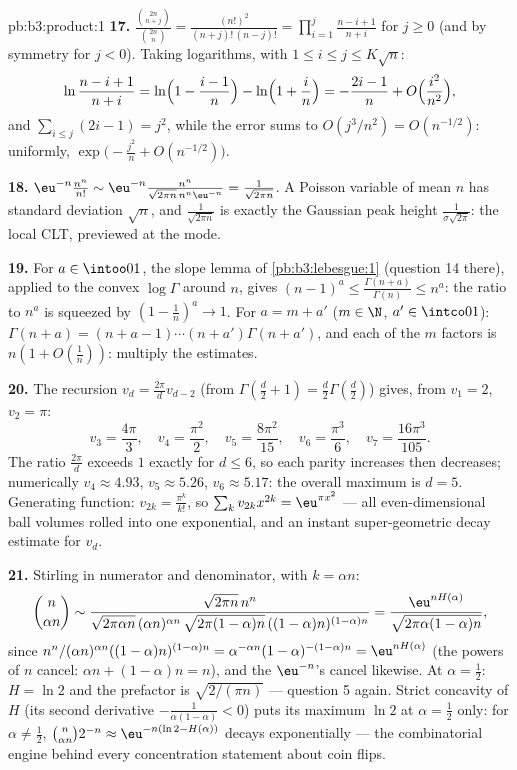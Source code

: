 \begin{solution}{pb:b3:product:1}
\textbf{17.} $\frac{\binom{2n}{n+j}}{\binom{2n}n} =
\frac{(n!)^2}{(n+j)!\,(n-j)!} =
\prod_{i=1}^{j}\frac{n-i+1}{n+i}$ for $j \geq 0$ (and by
symmetry for $j < 0$). Taking logarithms, with $1 \leq i
\leq j \leq K\sqrt n$:
\[
\ln\frac{n-i+1}{n+i} = \ln\Bigl(1 - \frac{i-1}n\Bigr) -
\ln\Bigl(1 + \frac in\Bigr) = -\frac{2i-1}{n} +
O\Bigl(\frac{i^2}{n^2}\Bigr),
\]
and $\sum_{i\leq j}(2i - 1) = j^2$, while the error sums to
$O(j^3/n^2) = O(n^{-1/2})$: uniformly,
$\exp\bigl(-\frac{j^2}n + O(n^{-1/2})\bigr)$.

\textbf{18.} $\eu^{-n}\frac{n^n}{n!} \sim \eu^{-n}
\frac{n^n}{\sqrt{2\pi n}\,n^n\eu^{-n}} =
\frac1{\sqrt{2\pi n}}$. A Poisson variable of mean $n$ has
standard deviation $\sqrt n$, and $\frac1{\sqrt{2\pi n}}$ is
exactly the Gaussian peak height $\frac1{\sigma\sqrt{2\pi}}$:
the local CLT, previewed at the mode.

\textbf{19.} For $a \in \intoo01$, the slope lemma of
\cref{pb:b3:lebesgue:1} (question 14 there), applied to the
convex $\log\Gamma$ around $n$, gives $(n-1)^a \leq
\frac{\Gamma(n+a)}{\Gamma(n)} \leq n^a$: the ratio to $n^a$
is squeezed by $(1 - \frac1n)^a \to 1$. For $a = m + a'$
($m \in \N$, $a' \in \intco01$): $\Gamma(n+a) = (n + a - 1)
\cdots(n + a')\Gamma(n + a')$, and each of the $m$ factors is
$n(1 + O(\frac1n))$: multiply the estimates.

\textbf{20.} The recursion $v_d = \frac{2\pi}dv_{d-2}$
(from $\Gamma(\frac d2 + 1) = \frac d2\Gamma(\frac d2)$)
gives, from $v_1 = 2$, $v_2 = \pi$:
\[
v_3 = \frac{4\pi}3,\quad v_4 = \frac{\pi^2}2,\quad
v_5 = \frac{8\pi^2}{15},\quad v_6 = \frac{\pi^3}6,\quad
v_7 = \frac{16\pi^3}{105}.
\]
The ratio $\frac{2\pi}d$ exceeds $1$ exactly for $d \leq 6$,
so each parity increases then decreases; numerically $v_4
\approx 4.93$, $v_5 \approx 5.26$, $v_6 \approx 5.17$: the
overall maximum is $d = 5$. Generating function: $v_{2k} =
\frac{\pi^k}{k!}$, so $\sum_kv_{2k}x^{2k} =
\eu^{\pi x^2}$ --- all even-dimensional ball volumes rolled
into one exponential, and an instant super-geometric decay
estimate for $v_d$.

\textbf{21.} Stirling in numerator and denominator, with $k =
\alpha n$:
\[
\binom n{\alpha n} \sim
\frac{\sqrt{2\pi n}\,n^n}
{\sqrt{2\pi\alpha n}\,(\alpha n)^{\alpha n}\,
\sqrt{2\pi(1-\alpha)n}\,((1-\alpha)n)^{(1-\alpha)n}}
= \frac{\eu^{nH(\alpha)}}{\sqrt{2\pi\alpha(1-\alpha)n}},
\]
since $n^n/(\alpha n)^{\alpha n}((1-\alpha)n)^{(1-\alpha)n} =
\alpha^{-\alpha n}(1-\alpha)^{-(1-\alpha)n} =
\eu^{nH(\alpha)}$ (the powers of $n$ cancel: $\alpha n +
(1-\alpha)n = n$), and the $\eu^{-n}$'s cancel likewise. At
$\alpha = \frac12$: $H = \ln2$ and the prefactor is
$\sqrt{2/(\pi n)}$ --- question 5 again. Strict concavity of
$H$ (its second derivative $-\frac1{\alpha(1-\alpha)} < 0$)
puts its maximum $\ln 2$ at $\alpha = \frac12$ only: for
$\alpha \neq \frac12$, $\binom n{\alpha n}2^{-n} \approx
\eu^{-n(\ln2 - H(\alpha))}$ decays exponentially --- the
combinatorial engine behind every concentration statement
about coin flips.


\end{solution}
